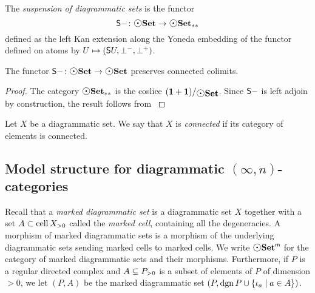 \begin{dfn} [Suspension]
    The \emph{suspension of diagrammatic sets} is the functor
    \begin{equation*}
        \sus{-} \colon \dgmSet \to \bpt{\dgmSet}
    \end{equation*} 
    defined as the left Kan extension along the Yoneda embedding of the functor defined on atoms by \( U \mapsto (\sus{U}, \bot^-, \bot^+) \).
\end{dfn}

\begin{prop} \label{prop:suspension_of_dgmSet}
    The functor \( \sus{-} \colon \dgmSet \to \dgmSet \) preserves connected colimits.    
\end{prop}
\begin{proof}
    The category \( \bpt{\dgmSet} \) is the coslice \( \slice{(\pt + \pt)}{\dgmSet} \).
    Since \( \sus{-} \) is left adjoin by construction, the result follows from \cite[Proposition 3.3.8]{riehl2019context}
\end{proof}

\begin{dfn} 
    Let \( X \) be a diagrammatic set. 
    We say that \( X \) is \emph{connected} if its category of elements is connected.
\end{dfn}

\begin{rmk} \label{rmk:ez_connected}
\end{rmk}


\subsection{Model structure for diagrammatic \texorpdfstring{$(\infty, n)$}{(∞, n)}-categories}


Recall that a \emph{marked diagrammatic set} is a diagrammatic set \( X \) together with a set \( A \subset \gr{> 0}{\cell X} \) called the \emph{marked cell}, containing all the degeneracies. 
A morphism of marked diagrammatic sets is a morphism of the underlying diagrammatic sets sending marked cells to marked cells.
We write \( \mdgmSet \) for the category of marked diagrammatic sets and their morphisms. 
Furthermore, if \( P \) is a regular directed complex and \( A \subseteq \gr{> 0}{P} \) is a subset of elements of \( P \) of dimension \( > 0 \), we let \( (P, A) \) be the marked diagrammatic set \( (P, \dgn P \cup \set{\mapel{a} \mid a \in A}) \).


